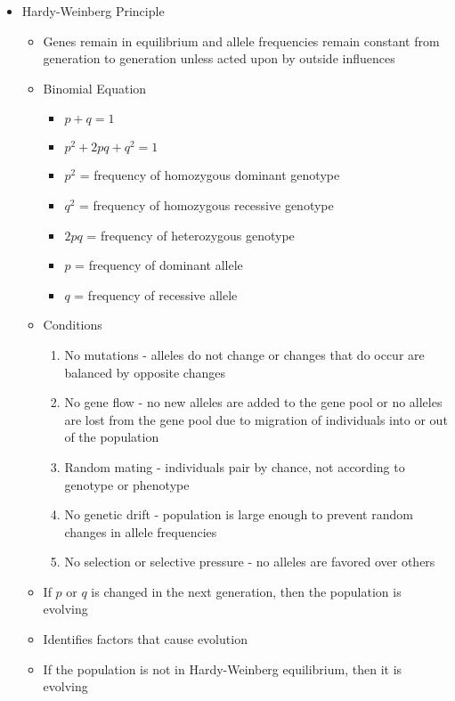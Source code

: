 \documentclass[12pt]{article}
\begin{document}
\begin{itemize}
\begin{itemize}
        \end{itemize}
        \item Hardy-Weinberg Principle
        \begin{itemize}
            \item Genes remain in equilibrium and allele frequencies remain constant from generation to generation unless acted upon by outside influences
            \item Binomial Equation
            \begin{itemize}
                \item $p + q = 1$
                \item $p^2 + 2pq + q^2 = 1$
                \item $p^2$ = frequency of homozygous dominant genotype
                \item $q^2$ = frequency of homozygous recessive genotype
                \item $2pq$ = frequency of heterozygous genotype
                \item $p$ = frequency of dominant allele
                \item $q$ = frequency of recessive allele
            \end{itemize}
            \item Conditions
            \begin{enumerate}
                \item No mutations - alleles do not change or changes that do occur are balanced by opposite changes
                \item No gene flow -  no new alleles are added to the gene pool or no alleles are lost from the gene pool due to migration of individuals into or out of the population
                \item Random mating - individuals pair by chance, not according to genotype or phenotype
                \item No genetic drift - population is large enough to prevent random changes in allele frequencies
                \item No selection or selective pressure - no alleles are favored over others
            \end{enumerate}
            \item If $p$ or $q$ is changed in the next generation, then the population is evolving
            \item Identifies factors that cause evolution
            \item If the population is not in Hardy-Weinberg equilibrium, then it is evolving

\end{itemize}
\end{itemize}
\end{document}
